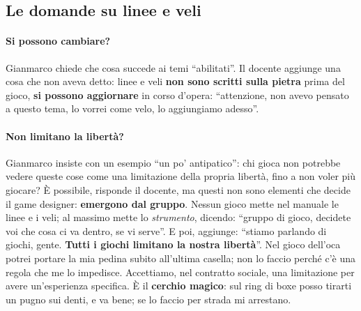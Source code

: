 \subsection{Le domande su linee e veli}

\paragraph{Si possono cambiare?} Gianmarco chiede che cosa succede ai temi
``abilitati''. Il docente aggiunge una cosa che non aveva detto: linee e veli
\textbf{non sono scritti sulla pietra} prima del gioco, \textbf{si possono
aggiornare} in corso d'opera: ``attenzione, non avevo pensato a questo tema, lo
vorrei come velo, lo aggiungiamo adesso''.

\paragraph{Non limitano la libertà?} Gianmarco insiste con un esempio ``un po'
antipatico'': chi gioca non potrebbe vedere queste cose come una limitazione della
propria libertà, fino a non voler più giocare? È possibile, risponde il docente, ma
questi non sono elementi che decide il game designer: \textbf{emergono dal gruppo}.
Nessun gioco mette nel manuale le linee e i veli; al massimo mette lo
\emph{strumento}, dicendo: ``gruppo di gioco, decidete voi che cosa ci va dentro, se vi
serve''. E poi, aggiunge: ``stiamo parlando di giochi, gente. \textbf{Tutti i giochi
limitano la nostra libertà}''. Nel gioco dell'oca potrei portare la mia pedina subito
all'ultima casella; non lo faccio perché c'è una regola che me lo impedisce.
Accettiamo, nel contratto sociale, una limitazione per avere un'esperienza specifica.
È il \textbf{cerchio magico}: sul ring di boxe posso tirarti un pugno sui denti, e va
bene; se lo faccio per strada mi arrestano.

